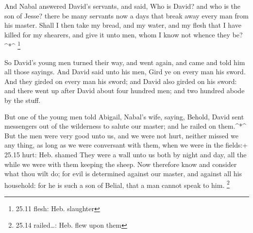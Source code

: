  And Nabal answered David's servants, and said, Who is
David? and who is the son of Jesse? there be many servants now a days
that break away every man from his master.  Shall I then
take my bread, and my water, and my flesh that I have killed for my
shearers, and give it unto men, whom I know not whence they be?\^{}*\^{}
\footnote{25.11 flesh: Heb. slaughter}

 So David's young men turned their way, and went again, and
came and told him all those sayings.  And David said unto
his men, Gird ye on every man his sword. And they girded on every man
his sword; and David also girded on his sword: and there went up after
David about four hundred men; and two hundred abode by the stuff.

 But one of the young men told Abigail, Nabal's wife,
saying, Behold, David sent messengers out of the wilderness to salute
our master; and he railed on them.\^{}*\^{}  But the men
were very good unto us, and we were not hurt, neither missed we any
thing, as long as we were conversant with them, when we were in the
fields:+ 25.15 hurt: Heb. shamed  They were a wall unto us
both by night and day, all the while we were with them keeping the
sheep.  Now therefore know and consider what thou wilt do;
for evil is determined against our master, and against all his
household: for he is such a son of Belial, that a man cannot speak to
him. \footnote{25.14 railed\ldots: Heb. flew upon them}

